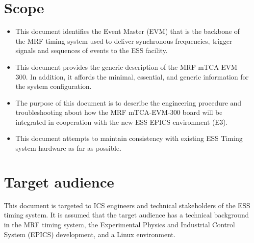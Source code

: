 \documentclass[11pt
  , a4paper
  , article
  , oneside
  , showtrims
]{memoir}
\begin{document}
\section{Scope}
\begin{itemize}
\item This document identifies the Event Master (EVM) that is the backbone of the MRF timing system used to deliver synchronous frequencies, trigger signals and sequences of events \cite{MRFEVENTGENERATOR} to the ESS facility.
\item This document provides the generic description of the MRF mTCA-EVM-300. In addition, it affords the minimal, essential, and generic information for the system configuration.
\item The purpose of this document is to describe the engineering procedure and troubleshooting about how the MRF mTCA-EVM-300 board will be integrated in cooperation with the new ESS EPICS environment (E3).
\item This document attempts to maintain consistency with existing ESS Timing system hardware as far as possible.
\end{itemize}

\section{Target audience}
This document is targeted to ICS engineers and technical stakeholders of the ESS timing system. It is assumed that the target audience has a technical background in the MRF timing system, the Experimental Physics and Industrial Control System (EPICS) development, and a Linux environment.\\
\end{document}
